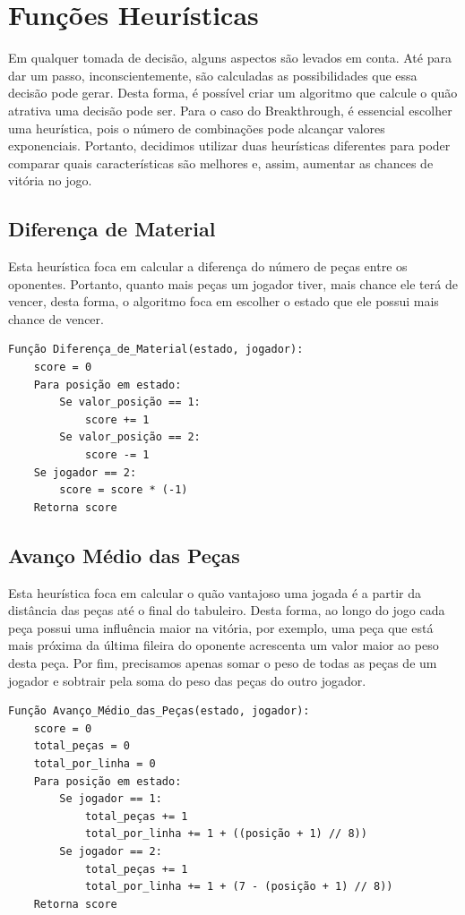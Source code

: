 \documentclass[12pt,a4paper]{article}
\begin{document}
\section{Funções Heurísticas}
Em qualquer tomada de decisão, alguns aspectos são levados em conta. Até para dar um passo, inconscientemente, são calculadas as possibilidades que essa decisão pode gerar. Desta forma, é possível criar um algoritmo que calcule o quão atrativa uma decisão pode ser.
Para o caso do Breakthrough, é essencial escolher uma heurística, pois o número de combinações pode alcançar valores exponenciais. Portanto, decidimos utilizar duas heurísticas diferentes para poder comparar quais características são melhores e, assim, aumentar as chances de vitória no jogo.

\subsection{Diferença de Material}
Esta heurística foca em calcular a diferença do número de peças entre os oponentes. Portanto, quanto mais peças um jogador tiver, mais chance ele terá de vencer, desta forma, o algoritmo foca em escolher o estado que ele possui mais chance de vencer.

\begin{verbatim}
Função Diferença_de_Material(estado, jogador):
    score = 0
    Para posição em estado:
        Se valor_posição == 1:
            score += 1
        Se valor_posição == 2:
            score -= 1
    Se jogador == 2:
        score = score * (-1)
    Retorna score
\end{verbatim}

\subsection{Avanço Médio das Peças}
Esta heurística foca em calcular o quão vantajoso uma jogada é a partir da distância das peças até o final do tabuleiro. Desta forma, ao longo do jogo cada peça possui uma influência maior na vitória, por exemplo, uma peça que está mais próxima da última fileira do oponente acrescenta um valor maior ao peso desta peça. Por fim, precisamos apenas somar o peso de todas as peças de um jogador e sobtrair pela soma do peso das peças do outro jogador.

\begin{verbatim}
Função Avanço_Médio_das_Peças(estado, jogador):
    score = 0
    total_peças = 0
    total_por_linha = 0
    Para posição em estado:
        Se jogador == 1:
            total_peças += 1
            total_por_linha += 1 + ((posição + 1) // 8))
        Se jogador == 2:
            total_peças += 1
            total_por_linha += 1 + (7 - (posição + 1) // 8))
    Retorna score
\end{verbatim}
\end{document}
